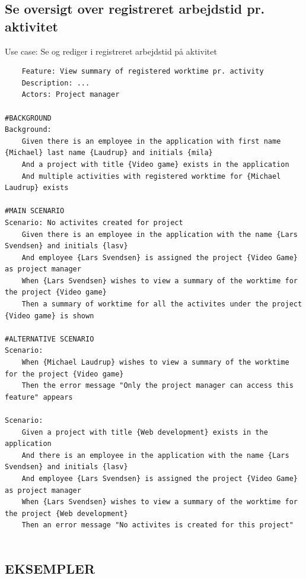 \subsection{Se oversigt over registreret arbejdstid pr. aktivitet}
\begin{listing}[H]
    \centering
    \caption{Use case: Se og rediger i registreret arbejdstid på aktivitet}\label{lst:usecase_oversigt_over_registreret_arbejdstid_pr_aktivitet}
    \begin{verbatim}  
    Feature: View summary of registered worktime pr. activity
    Description: ...
    Actors: Project manager

#BACKGROUND
Background: 
    Given there is an employee in the application with first name {Michael} last name {Laudrup} and initials {mila}
    And a project with title {Video game} exists in the application
    And multiple activities with registered worktime for {Michael Laudrup} exists

#MAIN SCENARIO
Scenario: No activites created for project
    Given there is an employee in the application with the name {Lars Svendsen} and initials {lasv}
    And employee {Lars Svendsen} is assigned the project {Video Game} as project manager
    When {Lars Svendsen} wishes to view a summary of the worktime for the project {Video game}
    Then a summary of worktime for all the activites under the project {Video game} is shown

#ALTERNATIVE SCENARIO
Scenario:  
    When {Michael Laudrup} wishes to view a summary of the worktime for the project {Video game}
    Then the error message "Only the project manager can access this feature" appears

Scenario: 
    Given a project with title {Web development} exists in the application
    And there is an employee in the application with the name {Lars Svendsen} and initials {lasv}
    And employee {Lars Svendsen} is assigned the project {Video Game} as project manager
    When {Lars Svendsen} wishes to view a summary of the worktime for the project {Web development}
    Then an error message "No activites is created for this project"


    \end{verbatim}
\end{listing}



\subsection{EKSEMPLER}

